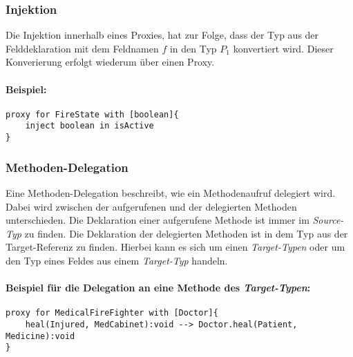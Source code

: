 \documentclass[a4paper,12pt]{article}
\begin{document}
\subsubsection{Injektion}
Die Injektion innerhalb eines Proxies, hat zur Folge, dass der Typ aus der Felddeklaration mit dem Feldnamen $f$ in den Typ $P_1$ konvertiert wird. Dieser Konverierung erfolgt wiederum über einen Proxy.
\paragraph{Beispiel:} 
\begin{lstlisting}[style = dsl]
proxy for FireState with [boolean]{
	inject boolean in isActive
}
\end{lstlisting}
\subsubsection{Methoden-Delegation}
Eine Methoden-Delegation beschreibt, wie ein Methodenaufruf delegiert wird. Dabei wird zwischen der aufgerufenen und der delegierten Methoden unterschieden. Die Deklaration einer aufgerufene Methode ist immer im \emph{Source-Typ} zu finden. Die Deklaration der delegierten Methoden ist in dem Typ aus der Target-Referenz zu finden. Hierbei kann es sich um einen \emph{Target-Typen} oder um den Typ eines Feldes aus einem \emph{Target-Typ} handeln.
\paragraph{Beispiel für die Delegation an eine Methode des \emph{Target-Typen}:}
\begin{lstlisting}[style = dsl]
proxy for MedicalFireFighter with [Doctor]{
	heal(Injured, MedCabinet):void --> Doctor.heal(Patient, Medicine):void
}
\end{lstlisting}
\end{document}

